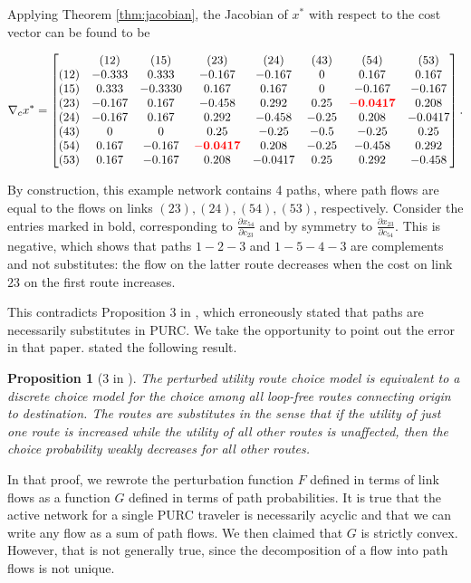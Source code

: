 \documentclass[a4paper,11pt]{article}
\newtheorem*{proposition*}{Proposition}
\def\tr{\color{red}}
\begin{document}
Applying Theorem \ref{thm:jacobian}, the Jacobian of $x^*$ with respect to the cost vector can be found to be 

\[
 \nabla_c x^* = \begin{bmatrix}

 &(12)&(15)&(23)&(24)&(43)&(54)&(53) \\
(12)&-0.333&0.333&-0.167&-0.167&0&0.167 &	0.167 \\
(15)&0.333 &-0.3330& 0.167&0.167&0&-0.167&-0.167\\
(23)&-0.167&0.167&-0.458&0.292&0.25&\mathbf{\tr -0.0417}&0.208\\
(24)&-0.167&0.167&0.292&-0.458&-0.25&0.208&-0.0417\\
(43)&0&0&0.25&-0.25&-0.5&-0.25&0.25\\
(54)&0.167&-0.167&\mathbf{\tr -0.0417}&0.208&-0.25&-0.458&0.292\\
(53)&0.167&-0.167&0.208&-0.0417&0.25&0.292&-0.458
\end{bmatrix}.
\]

By construction, this example network contains 4 paths, where path flows are equal to the flows on links $(23), (24), (54), (53)$, respectively.
Consider the entries marked in bold, corresponding to $\frac{\partial x_{54}}{\partial c_{23}} $ and by symmetry to $\frac{\partial x_{23}}{\partial c_{54}}$. This is negative, which shows that paths $1-2-3$ and $1-5-4-3$ are complements and not substitutes: the flow on the latter route decreases when the cost on link $23$ on the first route increases. 



This contradicts Proposition 3 in \citet{Fosgerau2021a}, which erroneously stated that paths are necessarily substitutes in PURC.
We take the opportunity to point out the error in that paper. \citet{Fosgerau2021a} stated the following result.
\begin{displayquote}
 \begin{proposition*}[3 in \citet{Fosgerau2021a}]
     The perturbed utility route choice model is equivalent to a discrete choice model for the choice among all loop-free routes connecting origin to destination. The routes are substitutes in the sense that if the utility of just one route is increased while the utility of all other routes is unaffected, then the choice probability weakly decreases for all other routes.
 \end{proposition*}
\end{displayquote}
%
In that proof, we rewrote the perturbation function $F$ defined in terms of link flows as a function $G$ defined in terms of path probabilities. It is true that the active network for a single PURC traveler is necessarily acyclic and that we can write any flow as a sum of path flows. We then claimed that $G$ is strictly convex. However, that is not generally true, since the decomposition of a flow into path flows is not unique. 
\end{document}
